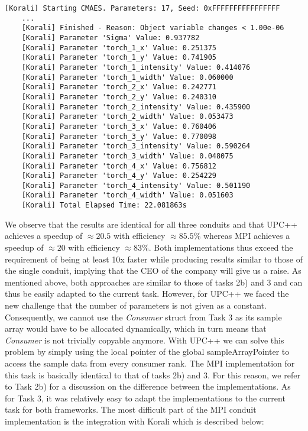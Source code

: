 \documentclass[11pt]{article}
\begin{document}
    \begin{lstlisting}[basicstyle=\tiny, frame=single, caption={Korali
    output for the MPI conduit when running the code from Task 1 with
    population size 23.}, label={lst:Task4MPI}]
    [Korali] Starting CMAES. Parameters: 17, Seed: 0xFFFFFFFFFFFFFFFF
    ...
    [Korali] Finished - Reason: Object variable changes < 1.00e-06
    [Korali] Parameter 'Sigma' Value: 0.937782
    [Korali] Parameter 'torch_1_x' Value: 0.251375
    [Korali] Parameter 'torch_1_y' Value: 0.741905
    [Korali] Parameter 'torch_1_intensity' Value: 0.414076
    [Korali] Parameter 'torch_1_width' Value: 0.060000
    [Korali] Parameter 'torch_2_x' Value: 0.242771
    [Korali] Parameter 'torch_2_y' Value: 0.240310
    [Korali] Parameter 'torch_2_intensity' Value: 0.435900
    [Korali] Parameter 'torch_2_width' Value: 0.053473
    [Korali] Parameter 'torch_3_x' Value: 0.760406
    [Korali] Parameter 'torch_3_y' Value: 0.770098
    [Korali] Parameter 'torch_3_intensity' Value: 0.590264
    [Korali] Parameter 'torch_3_width' Value: 0.048075
    [Korali] Parameter 'torch_4_x' Value: 0.756812
    [Korali] Parameter 'torch_4_y' Value: 0.254229
    [Korali] Parameter 'torch_4_intensity' Value: 0.501190
    [Korali] Parameter 'torch_4_width' Value: 0.051603
    [Korali] Total Elapsed Time: 22.081863s
    \end{lstlisting}

    We observe that the results are identical for all three conduits and
    that UPC++ achieves a speedup of $\approx 20.5$ with efficiency
    $\approx 85.5\%$ whereas MPI achieves a speedup of $\approx 20$ with
    efficiency $\approx 83\%$.
    Both implementations thus exceed the requirement of being at least 10x
    faster while producing results similar to those of the single conduit,
    implying that the CEO of the company will give us a raise.
    As mentioned above, both approaches are similar to those of tasks 2b)
    and 3 and can thus be easily adapted to the current task.
    However, for UPC++ we faced the new challenge that the number of
    parameters is not given as a constant.
    Consequently, we cannot use the \textit{Consumer} struct from Task 3 as
    its sample array would have to be allocated dynamically, which in turn
    means that \textit{Consumer} is not trivially copyable anymore.
    With UPC++ we can solve this problem by simply using the local pointer of
    the global sampleArrayPointer to access the sample data from every
    consumer rank.
    The MPI implementation for this task is basically identical to that of
    tasks 2b) and 3.
    For this reason, we refer to Task 2b) for a discussion on the difference
    between the implementations.
    As for Task 3, it was relatively easy to adapt the implementations to
    the current task for both frameworks.
    The most difficult part of the MPI conduit implementation is the
    integration with Korali which is described below:
\end{document}
